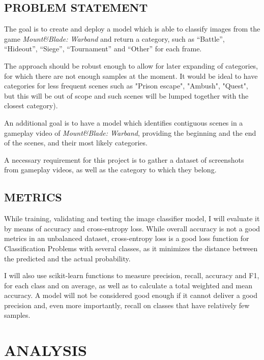\documentclass[
]{article}
\begin{document}
\newpage


\hypertarget{problem-statement}{%
\subsection{PROBLEM STATEMENT}\label{problem-statement}}

The goal is to create and deploy a model which is able to classify
images from the game \emph{Mount\&Blade: Warband} and return a category,
such as ``Battle'', ``Hideout'', ``Siege'', ``Tournament'' and
``Other'' for each frame.

The approach should be robust enough to allow for later expanding of categories, for which there are not enough samples at the moment.
It would be ideal to have categories for less frequent scenes such as "Prison escape", "Ambush", "Quest", but this will be out of scope and such scenes will be lumped together with the closest category).

An additional goal is to have a model which identifies contiguous scenes in a gameplay video of \emph{Mount\&Blade: Warband}, providing the beginning and the end of the scenes, and their most likely categories.

A necessary requirement for this project is to gather a dataset of screenshots from gameplay videos, as well as the category to which they belong.

\hypertarget{metrics}{%
\subsection{METRICS}\label{metrics}}

While training, validating and testing the image classifier model, I will evaluate it  by means of accuracy and cross-entropy loss.
While overall accuracy is not a good metrics in an unbalanced dataset, cross-entropy loss is a good loss function for Classification Problems with several classes, as it minimizes the distance between the predicted and the actual probability.

I will also use scikit-learn functions to measure precision, recall, accuracy and F1, for each class and on average, as well as to calculate a total weighted and mean accuracy. A model will not be considered good enough if it cannot deliver a good precision and, even more importantly, recall on classes that have relatively few samples.

\hypertarget{analysis}{%
\section{ANALYSIS}\label{analysis}}
\end{document}
